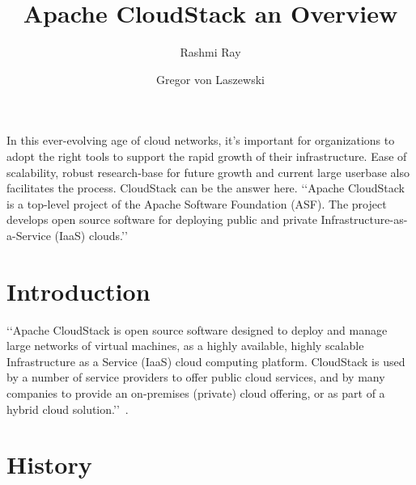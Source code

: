 
\title{Apache CloudStack an Overview}


\author{Rashmi Ray}

\author{Gregor von Laszewski}


\renewcommand{\shortauthors}{G. v. Laszewski}


\begin{abstract}

\end{abstract}


\maketitle

In this ever-evolving age of cloud networks, it’s important for organizations to adopt the right tools to support the rapid growth of their infrastructure. Ease of scalability, robust research-base for future growth and current large userbase also facilitates the process. CloudStack can be the answer here. ‘‘Apache CloudStack is a top-level project of the Apache Software Foundation (ASF). The project develops open source software for deploying public and private Infrastructure-as-a-Service (IaaS) clouds.’’ ~\cite{hid-sp18-417-www-cloudstack-apache} 

\section{Introduction}
‘‘Apache CloudStack is open source software designed to deploy and manage large networks of 
virtual machines, as a highly available, highly scalable Infrastructure as a Service (IaaS)
cloud computing platform. CloudStack is used by a number of service providers to offer public 
cloud services, and by many companies to provide an on-premises (private) cloud offering, 
or as part of a hybrid cloud solution.’’~\cite{hid-sp18-417-www-cloudstack-intro}. 

\section{History}

